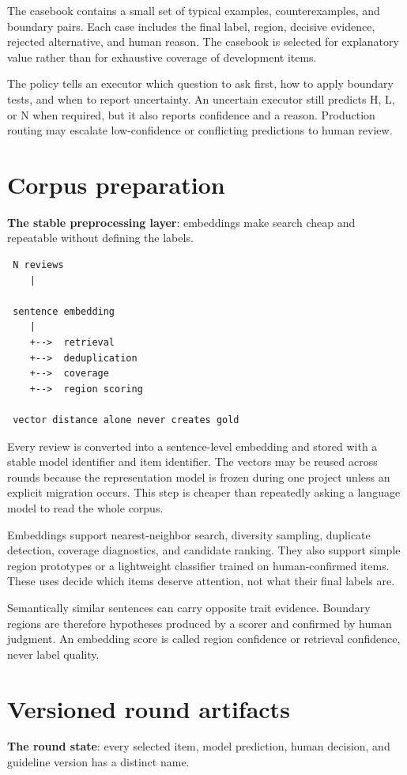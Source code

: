The casebook contains a small set of typical examples, counterexamples, and boundary pairs. Each case includes the final label, region, decisive evidence, rejected alternative, and human reason. The casebook is selected for explanatory value rather than for exhaustive coverage of development items.

The policy tells an executor which question to ask first, how to apply boundary tests, and when to report uncertainty. An uncertain executor still predicts H, L, or N when required, but it also reports confidence and a reason. Production routing may escalate low-confidence or conflicting predictions to human review.


\section{Corpus preparation}
\textbf{The stable preprocessing layer}: embeddings make search cheap and repeatable without defining the labels.

\begin{verbatim}
 N reviews
    |

 sentence embedding
    |
    +-->  retrieval
    +-->  deduplication
    +-->  coverage
    +-->  region scoring

 vector distance alone never creates gold
\end{verbatim}
Every review is converted into a sentence-level embedding and stored with a stable model identifier and item identifier. The vectors may be reused across rounds because the representation model is frozen during one project unless an explicit migration occurs. This step is cheaper than repeatedly asking a language model to read the whole corpus.

Embeddings support nearest-neighbor search, diversity sampling, duplicate detection, coverage diagnostics, and candidate ranking. They also support simple region prototypes or a lightweight classifier trained on human-confirmed items. These uses decide which items deserve attention, not what their final labels are.

Semantically similar sentences can carry opposite trait evidence. Boundary regions are therefore hypotheses produced by a scorer and confirmed by human judgment. An embedding score is called region confidence or retrieval confidence, never label quality.


\section{Versioned round artifacts}
\textbf{The round state}: every selected item, model prediction, human decision, and guideline version has a distinct name.

